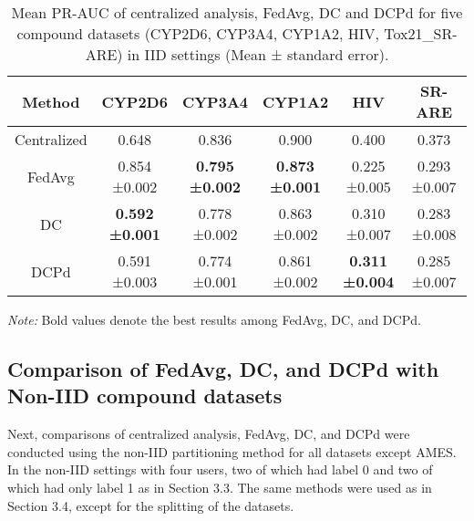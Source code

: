 \documentclass{article}
\begin{document}
\begin{table}[htbp]
\centering
\begin{threeparttable}
\caption{Mean PR-AUC of centralized analysis, FedAvg, DC and DCPd for five compound datasets (CYP2D6, CYP3A4, CYP1A2, HIV, Tox21\_SR-ARE) in IID settings (Mean ± standard error).}
  \label{tab:Table 6}
  \begin{tabular}{cccccc}
    \hline
Method & CYP2D6 & CYP3A4 & CYP1A2 & HIV & SR-ARE \\ 
    \hline
Centralized & 0.648 & 0.836 & 0.900 & 0.400 & 0.373\\ 
FedAvg & \makecell{0.854 \\ ±0.002} & \makecell{\textbf{0.795} \\ \textbf{±0.002}} & \makecell{\textbf{0.873} \\ \textbf{±0.001}} & \makecell{0.225 \\ ±0.005} & \makecell{0.293 \\ ±0.007} \\ 
DC & \makecell{\textbf{0.592} \\ \textbf{±0.001}} & \makecell{0.778 \\ ±0.002} & \makecell{0.863 \\ ±0.002} & \makecell{0.310 \\ ±0.007} & \makecell{0.283 \\ ±0.008} \\ 
DCPd & \makecell{0.591 \\ ±0.003} & \makecell{0.774 \\ ±0.001} & \makecell{0.861 \\ ±0.002} & \makecell{\textbf{0.311} \\ \textbf{±0.004}} & \makecell{0.285 \\ ±0.007} \\ 
    \hline
    \end{tabular}
\begin{tablenotes}
      \small
      \item \textit{Note:} Bold values denote the best results among FedAvg, DC, and DCPd.
\end{tablenotes}
\end{threeparttable}
\end{table}

\subsection{Comparison of FedAvg, DC, and DCPd with Non-IID compound datasets}
\label{sec:sample1}
Next, comparisons of centralized analysis, FedAvg, DC, and DCPd were conducted using the non-IID partitioning method for all datasets except AMES. In the non-IID settings with four users, two of which had label 0 and two of which had only label 1 as in Section 3.3. The same methods were used as in Section 3.4, except for the splitting of the datasets.
\end{document}
